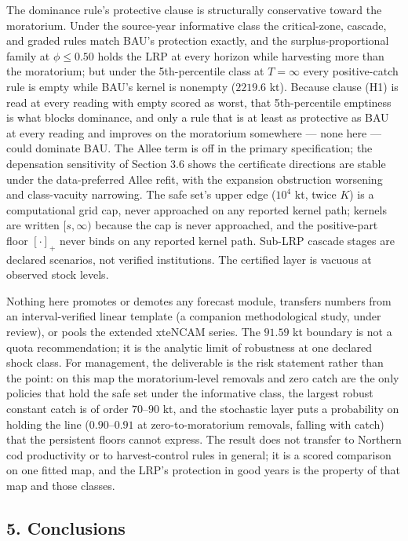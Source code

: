 \documentclass[11pt]{article}
\begin{document}
The dominance rule's protective clause is structurally conservative
toward the moratorium. Under the source-year informative class the
critical-zone, cascade, and graded rules match BAU's protection exactly,
and the surplus-proportional family at \(\phi \le 0.50\) holds the LRP
at every horizon while harvesting more than the moratorium; but under
the 5th-percentile class at \(T=\infty\) every positive-catch rule is
empty while BAU's kernel is nonempty (\(2219.6\) kt). Because clause
(H1) is read at every reading with empty scored as worst, that
5th-percentile emptiness is what blocks dominance, and only a rule that
is at least as protective as BAU at every reading and improves on the
moratorium somewhere --- none here --- could dominate BAU. The Allee
term is off in the primary specification; the depensation sensitivity of
Section 3.6 shows the certificate directions are stable under the
data-preferred Allee refit, with the expansion obstruction worsening and
class-vacuity narrowing. The safe set's upper edge (\(10^4\) kt, twice
\(K\)) is a computational grid cap, never approached on any reported
kernel path; kernels are written \([s, \infty)\) because the cap is
never approached, and the positive-part floor \([\cdot]_+\) never binds
on any reported kernel path. Sub-LRP cascade stages are declared
scenarios, not verified institutions. The certified layer is vacuous at
observed stock levels.

Nothing here promotes or demotes any forecast module, transfers numbers
from an interval-verified linear template (a companion methodological
study, under review), or pools the extended xteNCAM series. The \(91.59\)
kt boundary is not a quota recommendation; it is the analytic limit of
robustness at one declared shock class. For management, the deliverable
is the risk statement rather than the point: on this map the
moratorium-level removals and zero catch are the only policies that hold
the safe set under the informative class, the largest robust constant
catch is of order \(70\)--\(90\) kt, and the stochastic layer puts a
probability on holding the line (\(0.90\)--\(0.91\) at
zero-to-moratorium removals, falling with catch) that the persistent
floors cannot express. The result does not transfer to Northern cod
productivity or to harvest-control rules in general; it is a scored
comparison on one fitted map, and the LRP's protection in good years is
the property of that map and those classes.

\subsection{5. Conclusions}\label{budget-conclusions}
\end{document}
